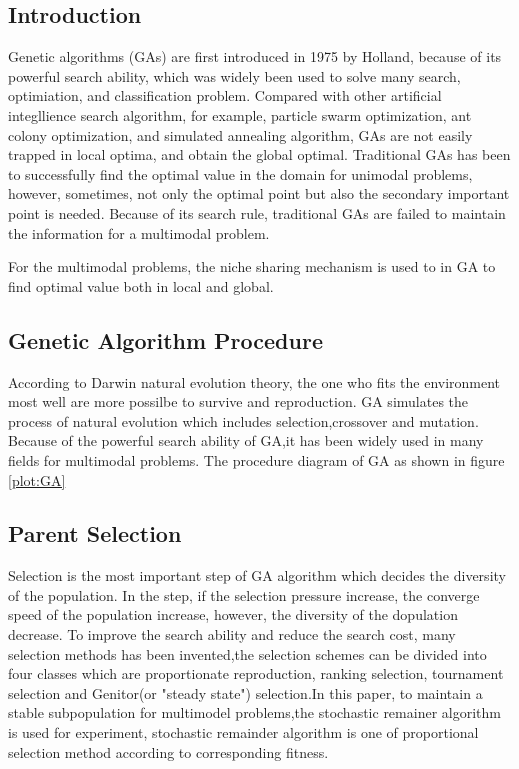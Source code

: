 \documentclass[smallextended]{svjour3}       %
\begin{document}
\begin{multicols}{2}

\section{Introduction}
Genetic algorithms (GAs) are first introduced in 1975 by
Holland\cite{sampson1976adaptation}, because of its powerful search ability,
which was widely been used to solve many search, optimiation, and classification
problem. Compared with other artificial integllience search algorithm, for example, particle
swarm optimization, ant colony optimization, and simulated annealing
algorithm\cite{zabinsky2010random}, GAs are not easily trapped in local optima,
and obtain the global optimal.  Traditional GAs has been to successfully find
the optimal value in the domain for unimodal problems, however, sometimes, not
only the optimal point but also the secondary important point is needed.
Because of its search rule, traditional GAs are failed to maintain the
information for a multimodal problem.

For the multimodal problems, the niche sharing mechanism is used to in GA to
find optimal value both in local and global.




\subsection{Genetic Algorithm Procedure}
According to Darwin natural evolution theory, the one who fits the environment
most well are more possilbe to survive and reproduction. GA simulates the
process of natural evolution which includes selection,crossover and mutation.
Because of the powerful search ability of GA,it has been widely used in many
fields for multimodal problems. The procedure diagram of GA as shown in figure
\ref{plot:GA} 
 
\subsection{Parent Selection}
Selection is the most important step of GA algorithm which decides the diversity
of the population. In the step, if the selection pressure increase, the converge
speed of the population increase, however, the diversity of the dopulation
decrease. To improve the search ability and reduce the search cost,
many selection methods \cite{goldberg1991comparative} has been invented,the
selection schemes can be divided into four classes which are proportionate
reproduction, ranking selection, tournament selection and Genitor(or "steady
state") selection.In this paper, to maintain a stable subpopulation for
multimodel problems,the stochastic remainer algorithm is used for experiment,
stochastic remainder algorithm is one of proportional selection method according
to corresponding fitness.


\end{multicols}
\end{document}
